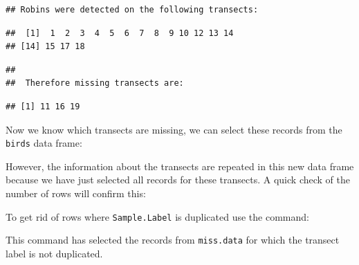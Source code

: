 \documentclass[10pt,a4paper]{tufte-handout}
\newenvironment{Shaded}{\begin{snugshade}}{\end{snugshade}}
\newcommand{\KeywordTok}[1]{\textcolor[rgb]{0.13,0.29,0.53}{\textbf{#1}}}
\newcommand{\NormalTok}[1]{#1}
\newcommand{\OperatorTok}[1]{\textcolor[rgb]{0.81,0.36,0.00}{\textbf{#1}}}
\newcommand{\StringTok}[1]{\textcolor[rgb]{0.31,0.60,0.02}{#1}}
\begin{document}
\begin{verbatim}
## Robins were detected on the following transects:
\end{verbatim}

\begin{verbatim}
##  [1]  1  2  3  4  5  6  7  8  9 10 12 13 14
## [14] 15 17 18
\end{verbatim}

\begin{verbatim}
## 
##  Therefore missing transects are:
\end{verbatim}

\begin{verbatim}
## [1] 11 16 19
\end{verbatim}

Now we know which transects are missing, we can select these records
from the \texttt{birds} data frame:

\begin{Shaded}
\end{Shaded}

However, the information about the transects are repeated in this new
data frame because we have just selected all records for these
transects. A quick check of the number of rows will confirm this:

\begin{Shaded}
\end{Shaded}

To get rid of rows where \texttt{Sample.Label} is duplicated use the
command:

\begin{Shaded}
\end{Shaded}

This command has selected the records from \texttt{miss.data} for which
the transect label is not duplicated.
\end{document}

